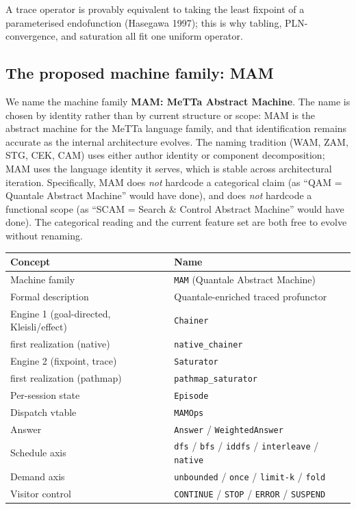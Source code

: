 \documentclass[11pt]{article}
\newcommand{\code}[1]{\texttt{#1}}
\begin{document}
A trace operator is provably equivalent to taking the least fixpoint
of a parameterised endofunction (Hasegawa 1997); this is why tabling,
PLN-convergence, and saturation all fit one uniform operator.

\subsection{The proposed machine family: MAM}

We name the machine family \textbf{MAM: MeTTa Abstract Machine}.
The name is chosen by identity rather than by current structure or
scope: MAM is the abstract machine for the MeTTa language family,
and that identification remains accurate as the internal architecture
evolves.  The naming tradition (WAM, ZAM, STG, CEK, CAM) uses either
author identity or component decomposition; MAM uses the language
identity it serves, which is stable across architectural iteration.
Specifically, MAM does \emph{not} hardcode a categorical claim (as
``QAM = Quantale Abstract Machine'' would have done), and does
\emph{not} hardcode a functional scope (as ``SCAM = Search \& Control
Abstract Machine'' would have done).  The categorical reading and the
current feature set are both free to evolve without renaming.

\begin{center}
\begin{tabular}{ll}
\toprule
\textbf{Concept} & \textbf{Name} \\
\midrule
Machine family & \code{MAM} (Quantale Abstract Machine) \\
Formal description & Quantale-enriched traced profunctor \\
Engine 1 (goal-directed, Kleisli/effect) & \code{Chainer} \\
\quad first realization (native) & \code{native\_chainer} \\
Engine 2 (fixpoint, trace) & \code{Saturator} \\
\quad first realization (pathmap) & \code{pathmap\_saturator} \\
Per-session state & \code{Episode} \\
Dispatch vtable & \code{MAMOps} \\
Answer & \code{Answer} / \code{WeightedAnswer} \\
Schedule axis & \code{dfs} / \code{bfs} / \code{iddfs} / \code{interleave} / \code{native} \\
Demand axis & \code{unbounded} / \code{once} / \code{limit-k} / \code{fold} \\
Visitor control & \code{CONTINUE} / \code{STOP} / \code{ERROR} / \code{SUSPEND} \\
\bottomrule
\end{tabular}
\end{center}
\end{document}
